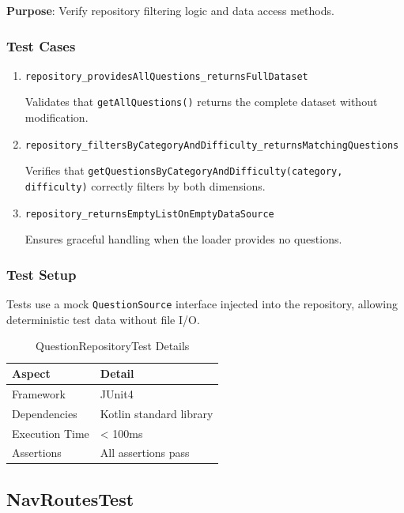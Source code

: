 \documentclass[12pt,a4paper]{article}
\begin{document}
\textbf{Purpose}: Verify repository filtering logic and data access methods.

\subsubsection{Test Cases}

\begin{enumerate}
    \item \texttt{repository\_providesAllQuestions\_returnsFullDataset}
    
    Validates that \texttt{getAllQuestions()} returns the complete dataset without modification.
    
    \item \texttt{repository\_filtersByCategoryAndDifficulty\_returnsMatchingQuestions}
    
    Verifies that \texttt{getQuestionsByCategoryAndDifficulty(category, difficulty)} correctly filters by both dimensions.
    
    \item \texttt{repository\_returnsEmptyListOnEmptyDataSource}
    
    Ensures graceful handling when the loader provides no questions.
\end{enumerate}

\subsubsection{Test Setup}

Tests use a mock \texttt{QuestionSource} interface injected into the repository, allowing deterministic test data without file I/O.

\begin{table}[H]
    \centering
    \caption{QuestionRepositoryTest Details}
    \begin{tabular}{|l|p{4cm}|}
        \hline
        \textbf{Aspect} & \textbf{Detail} \\
        \hline
        Framework & JUnit4 \\
        \hline
        Dependencies & Kotlin standard library \\
        \hline
        Execution Time & < 100ms \\
        \hline
        Assertions & All assertions pass \\
        \hline
    \end{tabular}
\end{table}

\subsection{NavRoutesTest}
\end{document}
